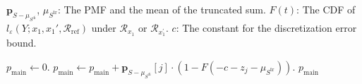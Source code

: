 \documentclass{article}
\theoremstyle{plain}
\theoremstyle{definition}
\begin{document}
\begin{algorithm}
\begin{algorithmic}[1]
\end{algorithmic}
\end{algorithm}


\renewcommand{\algorithmicrequire}{\textbf{Input:}}
\renewcommand{\algorithmicensure}{\textbf{Output:}}
\begin{algorithm}[H]
\caption{\textsc{CalculateMainTerm}}
\label{alg:calc_final_prob}
\begin{algorithmic}[1]
\Require
\State $\mathbf{p}_{S-\mu_{S^\mathrm{di}}}$, $\mu_{S^{\mathrm{tr}}}$: The PMF and the mean of the truncated sum.
\State $F(t)$: The CDF of $l_\varepsilon(Y;x_1,x_1',\mathcal R_{\mathrm{ref}})$ under $\mathcal{R}_{x_1}$ or $\mathcal{R}_{x_1^\prime}$.
\State $c$: The constant for the discretization error bound.

\State $p_{\text{main}} \gets 0$.
    \State $p_{\text{main}} \gets p_{\text{main}} + \mathbf{p}_{S-\mu_{S^\mathrm{di}}}[j] \cdot \left(1-F(-c-z_j-\mu_{S^{\mathrm{tr}}})\right)$.
\EndFor
\State \Return $p_{\text{main}}$
\end{algorithmic}
\end{algorithm}
\end{document}
